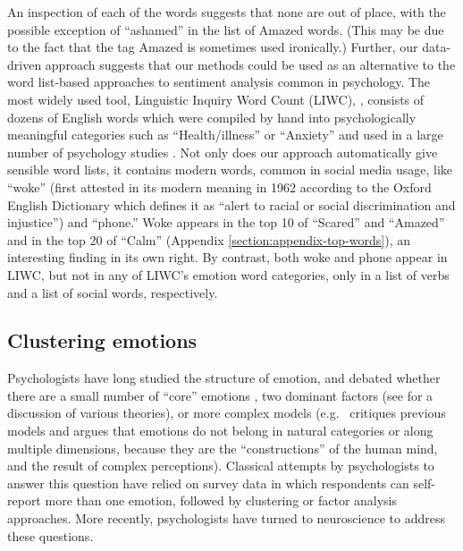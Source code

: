 \documentclass{article} %
\begin{document}
An inspection of each of the words suggests that none are out of place, with the possible exception of ``ashamed'' in the list of Amazed words. (This may be due to the fact that the tag Amazed is sometimes used ironically.) Further, our data-driven approach suggests that our methods could be used as an alternative to the word list-based approaches to sentiment analysis common in psychology. The most widely used tool, Linguistic Inquiry Word Count (LIWC), \citep{liwc2007}, consists of dozens of English words which were compiled by hand into psychologically meaningful categories such as ``Health/illness'' or ``Anxiety'' and used in a large number of psychology studies \citep{tausczik2010psychological}. Not only does our approach automatically give sensible word lists, it contains modern words, common in social media usage, like ``woke'' (first attested in its modern meaning in 1962 according to the Oxford English Dictionary which defines it as ``alert to racial or social discrimination and injustice'') and ``phone.'' Woke appears in the top 10 of ``Scared'' and ``Amazed'' and in the top 20 of ``Calm'' (Appendix \ref{section:appendix-top-words}), an interesting finding in its own right. By contrast, both woke and phone appear in LIWC, but not in any of LIWC's emotion word categories, only in a list of verbs and a list of social words, respectively. 

\subsection{Clustering emotions}
Psychologists have long studied the structure of emotion,
and debated whether there are a small number of ``core'' emotions \citep{ekman1992argument},
two dominant factors (see \citet{tellegen1999dimensional} for a discussion of various theories), or more complex models (e.g.~\citet{lindquist2013hundred} critiques previous models and argues that emotions do not belong in natural categories or along multiple dimensions, because they are the ``constructions'' of the human mind, and the result of complex perceptions). 
Classical attempts by psychologists to answer this question have relied on survey data in which respondents can self-report more than one emotion, followed by clustering or factor analysis approaches. More recently, psychologists have turned to neuroscience to address these questions.
\end{document}

